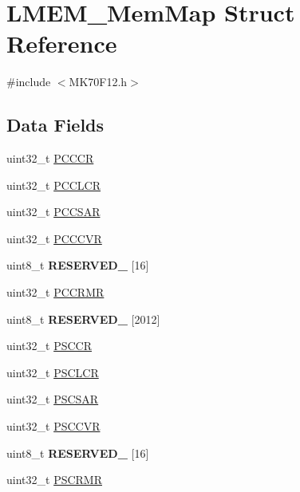 \hypertarget{struct_l_m_e_m___mem_map}{}\section{L\+M\+E\+M\+\_\+\+Mem\+Map Struct Reference}
\label{struct_l_m_e_m___mem_map}


{\ttfamily \#include $<$M\+K70\+F12.\+h$>$}

\subsection*{Data Fields}
\begin{DoxyCompactItemize}
\item 
uint32\+\_\+t \hyperlink{struct_l_m_e_m___mem_map_a6c1a7b2233d1c876439a885960f24960}{P\+C\+C\+C\+R}
\item 
uint32\+\_\+t \hyperlink{struct_l_m_e_m___mem_map_ad88f5f6b11fe26dbd6065a1767e6f4df}{P\+C\+C\+L\+C\+R}
\item 
uint32\+\_\+t \hyperlink{struct_l_m_e_m___mem_map_a2580365cbac4d397893ac168db87fa4d}{P\+C\+C\+S\+A\+R}
\item 
uint32\+\_\+t \hyperlink{struct_l_m_e_m___mem_map_a0dd1ccb32a70f4e5463d84acebc78cf0}{P\+C\+C\+C\+V\+R}
\item 
\hypertarget{struct_l_m_e_m___mem_map_a615e4c9bb609333b5438cd34753a02cb}{}uint8\+\_\+t {\bfseries R\+E\+S\+E\+R\+V\+E\+D\+\_} \mbox{[}16\mbox{]}\label{struct_l_m_e_m___mem_map_a615e4c9bb609333b5438cd34753a02cb}

\item 
uint32\+\_\+t \hyperlink{struct_l_m_e_m___mem_map_afd9bb5dd96464953c7be37e55627192e}{P\+C\+C\+R\+M\+R}
\item 
\hypertarget{struct_l_m_e_m___mem_map_a12dd9bc83a1593b030c19cdfac8c915a}{}uint8\+\_\+t {\bfseries R\+E\+S\+E\+R\+V\+E\+D\+\_} \mbox{[}2012\mbox{]}\label{struct_l_m_e_m___mem_map_a12dd9bc83a1593b030c19cdfac8c915a}

\item 
uint32\+\_\+t \hyperlink{struct_l_m_e_m___mem_map_ad26f05e85cf69da9518f970a37bf8c39}{P\+S\+C\+C\+R}
\item 
uint32\+\_\+t \hyperlink{struct_l_m_e_m___mem_map_a9002773a5254b5d1ebb9a46218ef21c4}{P\+S\+C\+L\+C\+R}
\item 
uint32\+\_\+t \hyperlink{struct_l_m_e_m___mem_map_ad54ebfe0c32863df5645bc4416dfe3dc}{P\+S\+C\+S\+A\+R}
\item 
uint32\+\_\+t \hyperlink{struct_l_m_e_m___mem_map_a4d271cf6da70b234d27d64eae216d3b7}{P\+S\+C\+C\+V\+R}
\item 
\hypertarget{struct_l_m_e_m___mem_map_a465302eb3bc6bbd7853799c24fb20b7f}{}uint8\+\_\+t {\bfseries R\+E\+S\+E\+R\+V\+E\+D\+\_} \mbox{[}16\mbox{]}\label{struct_l_m_e_m___mem_map_a465302eb3bc6bbd7853799c24fb20b7f}

\item 
uint32\+\_\+t \hyperlink{struct_l_m_e_m___mem_map_a06dad54d3dcb178443d2c9b0d5ae2496}{P\+S\+C\+R\+M\+R}
\end{DoxyCompactItemize}


